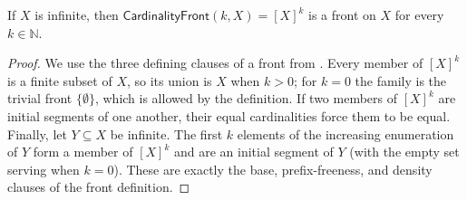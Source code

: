 \begin{lemma}
If $X$ is infinite, then $\mathsf{CardinalityFront}(k,X)=[X]^k$ is a
front on $X$ for every $k\in\mathbb N$.
\end{lemma}
\begin{proof}
We use the three defining clauses of a front from .
Every member of $[X]^k$ is a finite subset of $X$, so its union is $X$
when $k>0$; for $k=0$ the family is the trivial front
$\{\emptyset\}$, which is allowed by the definition.  If two members of
$[X]^k$ are initial segments of one another, their equal cardinalities
force them to be equal.  Finally, let $Y\subseteq X$ be infinite.  The
first $k$ elements of the increasing enumeration of $Y$ form a member of
$[X]^k$ and are an initial segment of $Y$ (with the empty set serving when
$k=0$).  These are exactly the base, prefix-freeness, and density clauses
of the front definition.
\end{proof}
